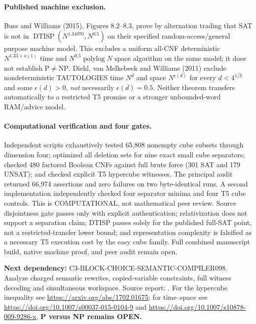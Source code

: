 \documentclass[11pt]{article}
\begin{document}
\paragraph{Published machine exclusion.}
Buss and Williams (2015), Figures 8.2--8.3, prove by alternation
trading that SAT is not in $\operatorname{DTISP}
(N^{1.34070},N^{0.5})$ on their specified random-access/general
purpose machine model. This excludes a uniform all-CNF deterministic
$N^{1.33+o(1)}$ time and $N^{0.5}\operatorname{polylog}N$ space
algorithm on the same model; it does not establish $\mathrm{P}\ne
\mathrm{NP}$. Diehl, van Melkebeek and Williams (2011) exclude
nondeterministic TAUTOLOGIES time $N^d$ and space $N^{\epsilon(d)}$
for every $d<4^{1/3}$ and some $\epsilon(d)>0$, \emph{not} necessarily
$\epsilon(d)=0.5$. Neither theorem transfers automatically to a
restricted T5 promise or a stronger unbounded-word RAM/advice model.

\paragraph{Computational verification and four gates.}
Independent scripts exhaustively tested 65,808 nonempty cube subsets
through dimension four; optimized all deletion sets for nine exact
small cube separators; checked 480 factored Boolean CNFs against
full brute force (301 SAT and 179 UNSAT); and checked explicit
T5 hypercube witnesses. The principal audit returned 66,974
assertions and zero failures on two byte-identical runs.
A second implementation independently checked four separator minima
and four T5 cube controls. This is COMPUTATIONAL, not mathematical
peer review. Source disjointness gate passes only with explicit
authentication; relativization does not support a separation claim;
DTISP passes solely for the published full-SAT point, not a
restricted-transfer lower bound; and representation complexity is
falsified as a necessary T5 execution cost by the easy cube family.
Full combined manuscript build, native machine proof, and peer
audit remain open.

\noindent\textbf{Next dependency:}
\textsf{C3-BLOCK-CHOICE-SEMANTIC-COMPILER098}. Analyze charged
semantic rewrites, copied-variable constraints, full witness
decoding and simultaneous workspace. Source report:
.
For the hypercube inequality see
\url{https://arxiv.org/abs/1702.01675};
for time--space see
\url{https://doi.org/10.1007/s00037-015-0104-9} and
\url{https://doi.org/10.1007/s10878-009-9286-x}.
\textbf{P versus NP remains OPEN.}
\end{document}
